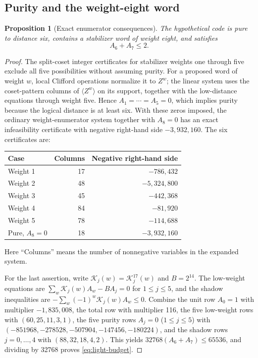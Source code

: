 \documentclass[11pt]{article}
\newtheorem{proposition}[theorem]{Proposition}
\theoremstyle{definition}
\theoremstyle{remark}
\begin{document}
\subsection{Purity and the weight-eight word}

\begin{proposition}[Exact enumerator consequences]\label{prop:17-enumerator}
The hypothetical code is pure to distance six, contains a stabilizer word
of weight eight, and satisfies
\begin{equation}\label{eq:light-budget}
 A_6+A_7\leq2.
\end{equation}
\end{proposition}
\begin{proof}
The split-coset integer certificates for stabilizer weights one through
five exclude all five possibilities without assuming purity. For a
proposed word of weight \(w\), local Clifford operations normalize it
to \(Z^w\); the linear system uses the coset-pattern columns of
\(\langle Z^w\rangle\) on its support, together with the low-distance
equations through weight five. Hence \(A_1=\cdots=A_5=0\), which implies
purity because the logical distance is at least six. With these zeros
imposed, the ordinary weight-enumerator system together with \(A_8=0\)
has an exact infeasibility certificate with negative right-hand side
\(-3{,}932{,}160\). The six certificates are:
\begin{center}\small
\begin{tabular}{@{}lrr@{}}\toprule
Case&Columns&Negative right-hand side\\\midrule
Weight 1&17&\(-786{,}432\)\\
Weight 2&48&\(-5{,}324{,}800\)\\
Weight 3&45&\(-442{,}368\)\\
Weight 4&84&\(-81{,}920\)\\
Weight 5&78&\(-114{,}688\)\\
Pure, \(A_8=0\)&18&\(-3{,}932{,}160\)\\\bottomrule
\end{tabular}
\end{center}
Here ``Columns'' means the number of nonnegative variables in the
expanded system.

For the last assertion, write \(\mathcal{K}_j(w)=\mathcal{K}_j^{17}(w)\)
and \(B=2^{14}\). The low-weight equations are
\(\sum_w \mathcal{K}_j(w)A_w-BA_j=0\) for \(1\leq j\leq5\), and the
shadow inequalities are \(-\sum_w(-1)^w\mathcal{K}_j(w)A_w\leq0\).
Combine the unit row \(A_0=1\) with multiplier \(-1{,}835{,}008\),
the total row with multiplier 116, the five low-weight rows with
\((60,25,11,3,1)\), the five purity rows \(A_j=0\) (\(1\leq j\leq5\))
with \((-851968,-278528,-507904,-147456,-180224)\), and the shadow rows
\(j=0,\ldots,4\) with \((88,32,18,4,2)\). This yields
\(32768(A_6+A_7)\leq65536\), and dividing by 32768 proves
\eqref{eq:light-budget}.
\end{proof}
\end{document}
